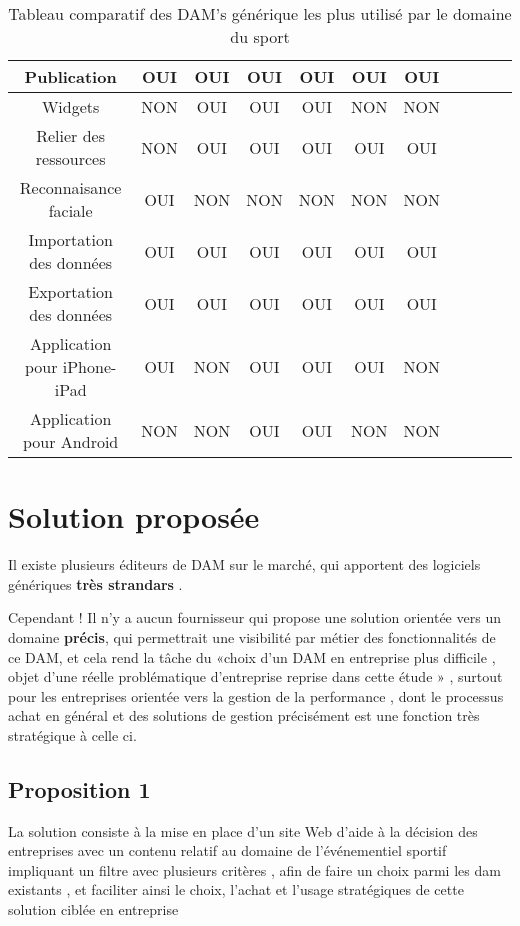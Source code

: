 \begin{sidewaystable}[ht]
\begin{center}
\begin{tabular}{|c|c|c|c|c|c|c|c|c|c|c|}
\hline
 Publication& OUI & OUI & OUI & OUI & OUI& OUI  \\
\hline
Widgets & NON & OUI & OUI & OUI & NON & NON  \\
\hline

Relier des ressources & NON & OUI & OUI & OUI & OUI & OUI  \\
\hline
Reconnaisance faciale& OUI & NON & NON & NON & NON & NON  \\
\hline
Importation des données  &OUI & OUI & OUI & OUI & OUI & OUI  \\
\hline
Exportation des données& OUI& OUI & OUI & OUI & OUI & OUI  \\
\hline
Application pour  iPhone-iPad & OUI &NON & OUI & OUI &OUI & NON  \\
\hline
Application pour Android& NON & NON & OUI &OUI& NON &NON  \\
\hline
\end{tabular}
\caption {Tableau comparatif des DAM's générique les plus utilisé par le domaine du sport}
\end{center}
\end{sidewaystable}



\chapter{Solution proposée}
Il existe plusieurs éditeurs de DAM sur le marché, qui apportent des logiciels
génériques \textbf{très strandars} .

Cependant ! Il n’y a aucun fournisseur qui propose une solution orientée vers un domaine \textbf{précis}, qui permettrait  une visibilité par métier des fonctionnalités de ce DAM,  et cela rend la tâche du «choix d’un DAM en entreprise plus difficile , objet d'une réelle problématique d'entreprise reprise dans cette étude » , surtout pour les entreprises orientée vers la gestion de la performance , dont le processus achat en général et des solutions de gestion précisément est une fonction très stratégique à celle ci. 

\section{Proposition 1} 

La solution consiste à la mise en place d’un site Web d’aide à la décision des
entreprises avec un contenu relatif au domaine de l’événementiel sportif impliquant un filtre avec plusieurs critères , afin de faire un choix parmi les dam existants , et faciliter ainsi le choix,  l'achat et l'usage stratégiques de cette solution ciblée en entreprise 

